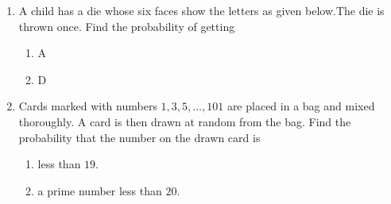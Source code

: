 \begin{enumerate}
\item A child has a die whose six faces show the letters as given below.The die is thrown once. Find the probability of getting 
\begin{figure}[ht]
\centering
{}
\end{figure}
\begin{enumerate}[label=\Roman*.]
\item A 
\item D 
\end{enumerate}
\item Cards marked with numbers $1,3,5, \ldots, 101$ are placed in a bag and mixed thoroughly. A card is then drawn at random from the bag. Find the probability that the number on the drawn card is 
\begin{enumerate}[label=\Roman*.]
\item less than $19$.
\item a prime number less than $20$. 
\end{enumerate}
\end{enumerate}
